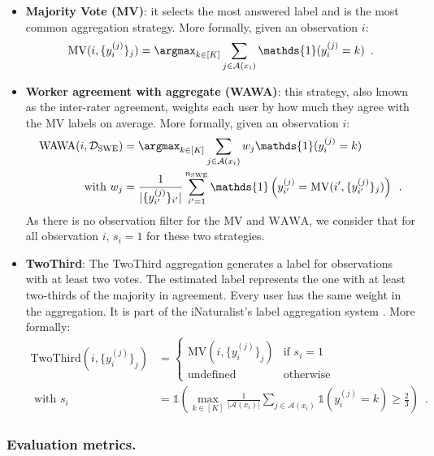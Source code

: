 \begin{itemize}
    \item \textbf{Majority Vote (MV)}: it selects the most answered label and is the most common aggregation strategy. More formally, given an observation $i$:
    \[\mathrm{MV}(i, \{y_i^{(j)}\}_j) = \argmax_{k\in [K]} \sum_{j\in\mathcal{A}(x_i)} \mathds{1}(y_i^{(j)} = k) \enspace.\]
    \item \textbf{Worker agreement with aggregate (WAWA)}: this strategy, also known as the inter-rater agreement, weights each user by how much they agree with the MV labels on average. More formally, given an observation $i$:
    \begin{align*}
        \mathrm{WAWA}(i, \mathcal{D}_{\mathrm{SWE}}) &= \argmax_{k\in [K]} \sum_{j\in\mathcal{A}(x_i)} w_j\mathds{1}(y_i^{(j)} = k) \\
        \text{with } w_j &= \frac{1}{|\{y_{i'}^{(j)}\}_{i'}|} \sum_{i'=1}^{n_{\mathrm{SWE}}} \mathds{1}\left(y_{i'}^{(j)} = \mathrm{MV}(i',\{y_{i'}^{(j)}\}_j)\right)\enspace.
        \end{align*}
    As there is no observation filter for the $\mathrm{MV}$ and $\mathrm{WAWA}$, we consider that for all observation $i$, $s_i=1$ for these two strategies.

    \item \textbf{TwoThird}: The TwoThird aggregation generates a label for observations with at least two votes. The estimated label represents the one with at least two-thirds of the majority in agreement. Every user has the same weight in the aggregation. It is part of the iNaturalist's label aggregation system \citep{van2018inaturalist}. More formally:
    \begin{align*}
        \mathrm{TwoThird}(i, \{y_i^{(j)}\}_j) &= \begin{cases}
            \mathrm{MV}(i, \{y_i^{(j)}\}_j) & \text{if } s_i=1  \\
            \text{undefined} & \text{otherwise} \end{cases}
            \\ \text{ with } s_i &= \mathds{1}\left(\displaystyle\max_{k\in[K]}\frac{1}{|\mathcal{A}(x_i)|}\sum_{j\in\mathcal{A}(x_i)} \mathds{1}(y_i^{(j)}=k) \geq \frac{2}{3}\right) \enspace.
    \end{align*}
\end{itemize}

\subsubsection{Evaluation metrics.}

